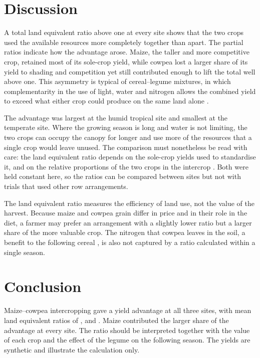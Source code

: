 \section{Discussion}

A total land equivalent ratio above one at every site shows that the two
crops used the available resources more completely together than apart. The
partial ratios indicate how the advantage arose. Maize, the taller and more
competitive crop, retained most of its sole-crop yield, while cowpea lost a
larger share of its yield to shading and competition yet still contributed
enough to lift the total well above one. This asymmetry is typical of
cereal--legume mixtures, in which complementarity in the use of light,
water and nitrogen allows the combined yield to exceed what either crop could
produce on the same land alone \parencite{brooker2015}.

The advantage was largest at the humid tropical site and smallest at the
temperate site. Where the growing season is long and water is not limiting,
the two crops can occupy the canopy for longer and use more of the resources
that a single crop would leave unused. The comparison must nonetheless be read
with care: the land equivalent ratio depends on the sole-crop yields used to
standardise it, and on the relative proportions of the two crops in the
intercrop \parencite{mead1980}. Both were held constant here, so the ratios
can be compared between sites but not with trials that used other row
arrangements.

The land equivalent ratio measures the efficiency of land use, not the value
of the harvest. Because maize and cowpea grain differ in price and in their
role in the diet, a farmer may prefer an arrangement with a slightly lower
ratio but a larger share of the more valuable crop. The nitrogen that cowpea
leaves in the soil, a benefit to the following cereal \parencite{vanlauwe2010},
is also not captured by a ratio calculated within a single season.

\section{Conclusion}

Maize--cowpea intercropping gave a yield advantage at all three sites, with
mean land equivalent ratios of ,  and
. Maize contributed the larger share of the advantage at every
site. The ratio should be interpreted together with the value of each crop and
the effect of the legume on the following season. The yields are synthetic
and illustrate the calculation only.

